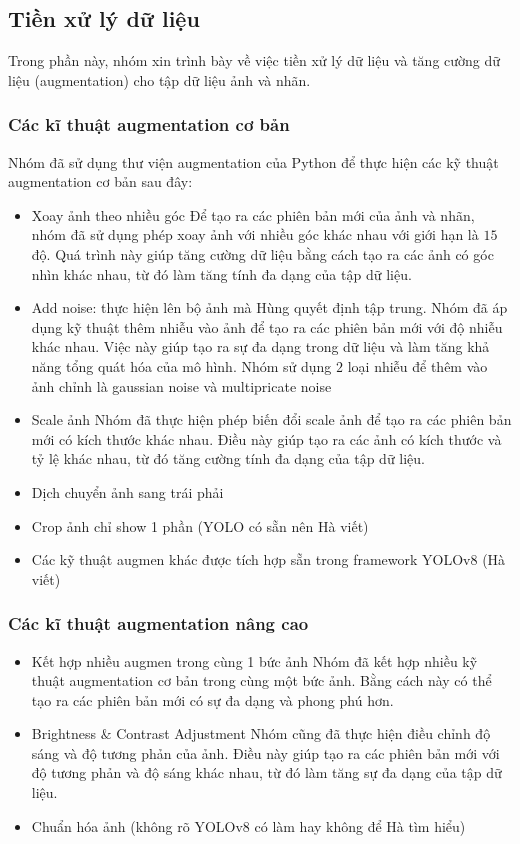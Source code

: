 \documentclass[a4paper,12pt]{article}
\begin{document}
\subsection{Tiền xử lý dữ liệu}
Trong phần này, nhóm xin trình bày về việc tiền xử lý dữ liệu và tăng cường dữ liệu (augmentation) cho tập dữ liệu ảnh và nhãn.
\subsubsection{Các kĩ thuật augmentation cơ bản}
Nhóm đã sử dụng thư viện augmentation của Python để thực hiện các kỹ thuật augmentation cơ bản sau đây:
\begin{itemize}
    \item Xoay ảnh theo nhiều góc
    Để tạo ra các phiên bản mới của ảnh và nhãn, nhóm đã sử dụng phép xoay ảnh với nhiều góc khác nhau với giới hạn là $15$ độ. Quá trình này giúp tăng cường dữ liệu bằng cách tạo ra các ảnh có góc nhìn khác nhau, từ đó làm tăng tính đa dạng của tập dữ liệu.
    \item Add noise: thực hiện lên bộ ảnh mà Hùng quyết định tập trung.
    Nhóm đã áp dụng kỹ thuật thêm nhiễu vào ảnh để tạo ra các phiên bản mới với độ nhiễu khác nhau. Việc này giúp tạo ra sự đa dạng trong dữ liệu và làm tăng khả năng tổng quát hóa của mô hình.
    Nhóm sử dụng $2$ loại nhiễu để thêm vào ảnh chỉnh là gaussian noise và multipricate noise
    \item Scale ảnh
    Nhóm đã thực hiện phép biến đổi scale ảnh để tạo ra các phiên bản mới có kích thước khác nhau. Điều này giúp tạo ra các ảnh có kích thước và tỷ lệ khác nhau, từ đó tăng cường tính đa dạng của tập dữ liệu.
    \item Dịch chuyển ảnh sang trái phải
    \item Crop ảnh chỉ show 1 phần (YOLO có sẵn nên Hà viết)
    \item Các kỹ thuật augmen khác được tích hợp sẵn trong framework YOLOv8 (Hà viết)
\end{itemize}
\subsubsection{Các kĩ thuật augmentation nâng cao}

\begin{itemize}
    \item Kết hợp nhiều augmen trong cùng 1 bức ảnh
    Nhóm đã kết hợp nhiều kỹ thuật augmentation cơ bản trong cùng một bức ảnh. Bằng cách này có thể tạo ra các phiên bản mới có sự đa dạng và phong phú hơn.
    \item Brightness $\&$ Contrast Adjustment
    Nhóm cũng đã thực hiện điều chỉnh độ sáng và độ tương phản của ảnh. Điều này giúp tạo ra các phiên bản mới với độ tương phản và độ sáng khác nhau, từ đó làm tăng sự đa dạng của tập dữ liệu.
    \item Chuẩn hóa ảnh (không rõ YOLOv8 có làm hay không để Hà tìm hiểu)
\end{itemize}
\end{document}
